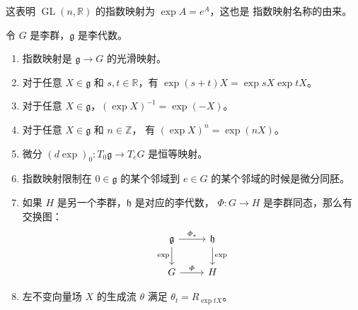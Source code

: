 \documentclass[fontset=none]{Notes}
\DeclareMathOperator\GL{GL}
\newcommand{\lie}[1]{\mathfrak{#1}}
\begin{document}
\begin{example}
  这表明 $\GL(n,\mathbb{R})$ 的指数映射为 $\exp A=e^A$，这也是
  指数映射名称的由来。
\end{example}

\begin{proposition}[指数映射的性质]
  令 $G$ 是李群，$\lie g$ 是李代数。
  \begin{enumerate}
    \item 指数映射是 $\lie g\to G$ 的光滑映射。
    \item 对于任意 $X\in\lie g$ 和 $s,t\in \mathbb{R}$，有
    $\exp(s+t)X=\exp sX \exp tX$。
    \item 对于任意 $X\in\lie g$，$(\exp X)^{-1}=\exp(-X)$。
    \item 对于任意 $X\in\lie g$ 和 $n\in \mathbb{Z}$，
    有 $(\exp X)^n=\exp(nX)$。
    \item 微分 $(d\exp)_0:T_0\lie g\to T_eG$ 是恒等映射。
    \item 指数映射限制在 $0\in \lie g$ 的某个邻域到
    $e\in G$ 的某个邻域的时候是微分同胚。
    \item 如果 $H$ 是另一个李群，$\lie h$ 是对应的李代数，
    $\varPhi:G\to H$ 是李群同态，那么有交换图：
    \begin{equation}
      \begin{tikzcd}
        \lie g\arrow[d,"\exp"']\arrow[r,"\varPhi_*"] &\lie h
        \arrow[d,"\exp"] \\
        G\arrow[r,"\varPhi"] & H 
      \end{tikzcd}
    \end{equation}
    \item 左不变向量场 $X$ 的生成流 $\theta$ 满足 
    $\theta_t=R_{\exp tX}$。
  \end{enumerate}  
\end{proposition}

 
\end{document}
